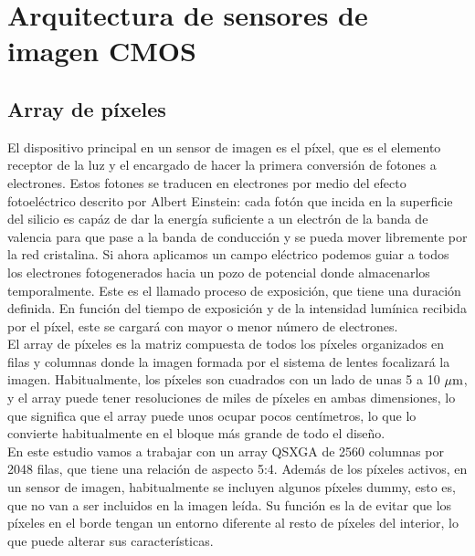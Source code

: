 
\section{Arquitectura de sensores de imagen CMOS}

\subsection{Array de píxeles}\label{cap:pxa_array}

El dispositivo principal en un sensor de imagen es el píxel, que es el elemento
receptor de la luz y el encargado de hacer la primera conversión de fotones a
electrones. Estos fotones se traducen en electrones por medio del efecto fotoeléctrico
descrito por Albert Einstein: cada fotón que incida en la superficie del silicio
es capáz de dar la energía suficiente a un electrón de la banda de valencia para que
pase a la banda de conducción y se pueda mover libremente por la red cristalina.
Si ahora aplicamos un campo eléctrico podemos guiar a todos los electrones
fotogenerados hacia un pozo de potencial donde almacenarlos temporalmente. Este
es el llamado proceso de exposición, que tiene una duración definida. En función
del tiempo de exposición y de la intensidad lumínica recibida por el píxel, este
se cargará con mayor o menor número de electrones.\\

El array de píxeles es la matriz compuesta de todos los píxeles organizados en filas
y columnas donde la imagen formada por el sistema de lentes focalizará la imagen.
Habitualmente, los píxeles son cuadrados con un lado de unas 5 a 10 $\mu\text{m}$, y el
array puede tener resoluciones de miles de píxeles en ambas dimensiones, lo que
significa que el array puede unos ocupar pocos centímetros, lo que lo convierte
habitualmente en el bloque más grande de todo el diseño.\\

En este estudio vamos a trabajar con un array QSXGA de 2560 columnas por 2048 filas,
que tiene una relación de aspecto 5:4. Además de los píxeles activos, en un sensor
de imagen, habitualmente se incluyen algunos píxeles dummy, esto es, que no van
a ser incluidos en la imagen leída. Su función es la de evitar que los píxeles
en el borde tengan un entorno diferente al resto de píxeles del interior, lo que
puede alterar sus características.\\

